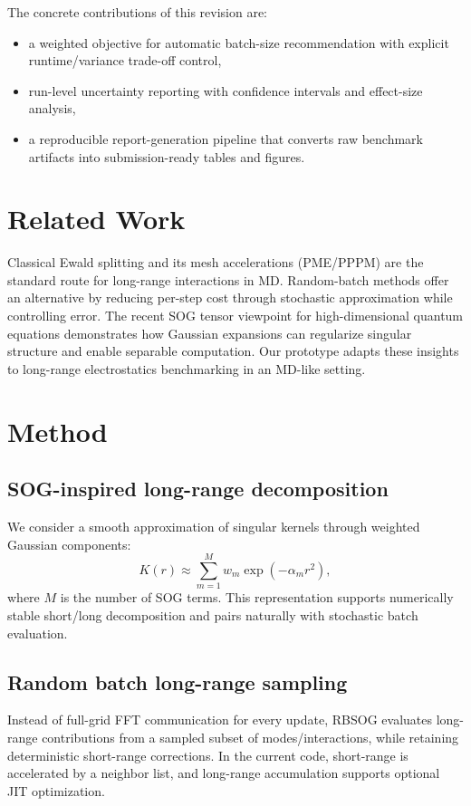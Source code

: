 \documentclass[conference]{IEEEtran}
\begin{document}
The concrete contributions of this revision are:
\begin{itemize}
\item a weighted objective for automatic batch-size recommendation with explicit runtime/variance trade-off control,
\item run-level uncertainty reporting with confidence intervals and effect-size analysis,
\item a reproducible report-generation pipeline that converts raw benchmark artifacts into submission-ready tables and figures.
\end{itemize}

\section{Related Work}
Classical Ewald splitting and its mesh accelerations (PME/PPPM) are the standard route for long-range interactions in MD.
Random-batch methods offer an alternative by reducing per-step cost through stochastic approximation while controlling error.
The recent SOG tensor viewpoint for high-dimensional quantum equations demonstrates how Gaussian expansions can regularize singular structure and enable separable computation.
Our prototype adapts these insights to long-range electrostatics benchmarking in an MD-like setting.

\section{Method}
\subsection{SOG-inspired long-range decomposition}
We consider a smooth approximation of singular kernels through weighted Gaussian components:
\begin{equation}
K(r) \approx \sum_{m=1}^{M} w_m \exp(-\alpha_m r^2),
\label{eq:sog}
\end{equation}
where $M$ is the number of SOG terms.
This representation supports numerically stable short/long decomposition and pairs naturally with stochastic batch evaluation.

\subsection{Random batch long-range sampling}
Instead of full-grid FFT communication for every update,
RBSOG evaluates long-range contributions from a sampled subset of modes/interactions,
while retaining deterministic short-range corrections.
In the current code, short-range is accelerated by a neighbor list,
and long-range accumulation supports optional JIT optimization.
\end{document}
